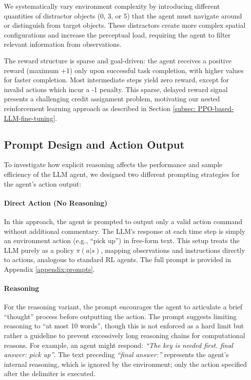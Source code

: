 \documentclass[11pt,a4paper]{article}
\begin{document}
We systematically vary environment complexity by introducing different quantities of distractor objects (0, 3, or 5) 
that the agent must navigate around or distinguish from target objects. 
These distractors create more complex spatial configurations and increase the perceptual load, 
requiring the agent to filter relevant information from observations.

The reward structure is sparse and goal-driven: the agent receives a positive reward (maximum +1) 
only upon successful task completion, with higher values for faster completion. 
Most intermediate steps yield zero reward, except for invalid actions which incur a -1 penalty. 
This sparse, delayed reward signal presents a challenging credit assignment problem, 
motivating our nested reinforcement learning approach as described in Section \ref{subsec: PPO-based-LLM-fine-tuning}.

\subsection{Prompt Design and Action Output}
\label{subsec: 3.4}
To investigate how explicit reasoning affects the performance and sample efficiency of the LLM agent, we designed two different prompting strategies for the agent's action output:

\paragraph{Direct Action (No Reasoning)} 
In this approach, the agent is prompted to output only a valid action command without additional commentary. The LLM's response at each time step is simply an environment action (e.g., ``pick up'') in free-form text. This setup treats the LLM purely as a policy $\pi(a|s)$, mapping observations and instructions directly to actions, analogous to standard RL agents. The full prompt is provided in Appendix \ref{appendix:prompts}.

\paragraph{Reasoning}
For the reasoning variant, the prompt encourages the agent to articulate a brief ``thought'' process before outputting the action. The prompt suggests limiting reasoning to ``at most 10 words'', though this is not enforced as a hard limit but rather a guideline to prevent excessively long reasoning chains for computational reasons. For example, an agent might respond: \textit{``The key is needed first. final answer: pick up''}. The text preceding \textit{``final answer:''} represents the agent's internal reasoning, which is ignored by the environment; only the action specified after the delimiter is executed.
\end{document}

